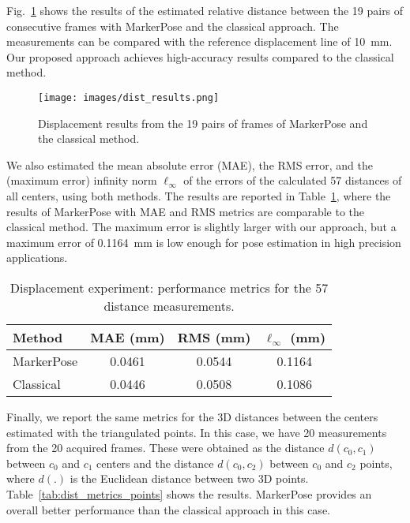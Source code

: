 \documentclass[final]{cvpr}
\begin{document}
Fig.~\ref{fig:dist_results} shows the results of the estimated relative distance between the 19 pairs of consecutive frames with MarkerPose and the classical approach. The measurements can be compared with the reference displacement line of 10~mm. Our proposed approach achieves high-accuracy results compared to the classical method.

\begin{figure}[h]
    \centering
    \texttt{[image: images/dist\_results.png]}
    \caption{Displacement results from the 19 pairs of frames of MarkerPose and the classical method.}
    \label{fig:dist_results}
\end{figure}

We also estimated the mean absolute error (MAE), the RMS error, and the (maximum error) infinity norm $\ell_\infty$ of the errors of the calculated 57 distances of all centers, using both methods. The results are reported in Table~\ref{tab:dist_metrics}, where the results of MarkerPose with MAE and RMS metrics are comparable to the classical method. The maximum error is slightly larger with our approach, but a maximum error of 0.1164~mm is low enough for pose estimation in high precision applications.

\begin{table}[h]
\centering
\begin{tabular}{lccc}
\textbf{Method} & \textbf{MAE (mm)} & \textbf{RMS (mm)} & $\mathbf{\ell_\infty}$ \textbf{(mm)} \\ \hline
MarkerPose        & 0.0461            & 0.0544            & 0.1164                 \\
Classical       & 0.0446            & 0.0508            & 0.1086                 \\ \hline
\end{tabular}
\caption{Displacement experiment: performance metrics for the 57 distance measurements.}
\label{tab:dist_metrics}
\end{table}

Finally, we report the same metrics for the 3D distances between the centers estimated with the triangulated points. In this case, we have 20 measurements from the 20 acquired frames. These were obtained as the distance $d(c_0,c_1)$  between $c_0$ and $c_1$ centers and the distance $d(c_0,c_2)$  between $c_0$ and $c_2$ points, where $d(.)$ is the Euclidean distance between two 3D points. Table~\ref{tab:dist_metrics_points} shows the results. MarkerPose provides an overall better performance than the classical approach in this case.
\end{document}
